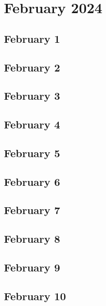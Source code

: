%
%
%

\chapter{February 2024}
\label{intro} %

\section{February 1}

\section{February 2}

\section{February 3}

\section{February 4}

\section{February 5}

\section{February 6}

\section{February 7}

\section{February 8}

\section{February 9}

\section{February 10}

